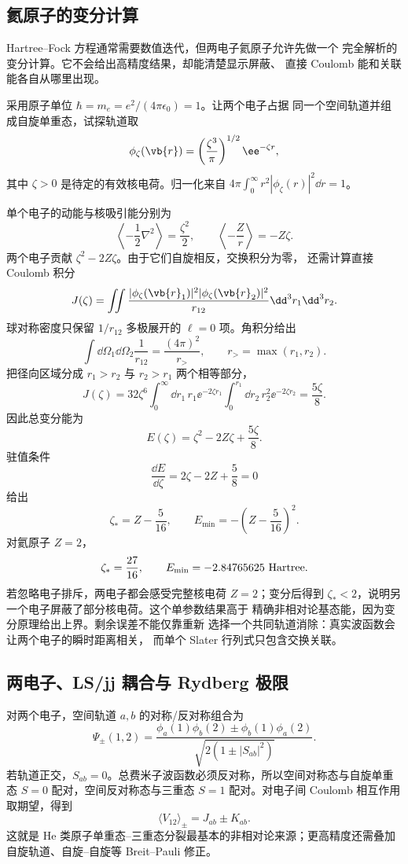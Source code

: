 \subsection{氦原子的变分计算}

Hartree--Fock 方程通常需要数值迭代，但两电子氦原子允许先做一个
完全解析的变分计算。它不会给出高精度结果，却能清楚显示屏蔽、
直接 Coulomb 能和关联能各自从哪里出现。

采用原子单位 $\hbar=m_e=e^2/(4\pi\epsilon_0)=1$。让两个电子占据
同一个空间轨道并组成自旋单重态，试探轨道取
\[
\phi_\zeta(\vb{r})
=\left(\frac{\zeta^3}{\pi}\right)^{1/2}
\ee^{-\zeta r},
\]
其中 $\zeta>0$ 是待定的有效核电荷。归一化来自
$4\pi\int_0^\infty r^2|\phi_\zeta(r)|^2\dd r=1$。

单个电子的动能与核吸引能分别为
\[
\left\langle-\frac12\nabla^2\right\rangle
=\frac{\zeta^2}{2},
\qquad
\left\langle-\frac Zr\right\rangle=-Z\zeta.
\]
两个电子贡献 $\zeta^2-2Z\zeta$。由于它们自旋相反，交换积分为零，
还需计算直接 Coulomb 积分
\[
J(\zeta)=
\iint\frac{
|\phi_\zeta(\vb{r}_1)|^2
|\phi_\zeta(\vb{r}_2)|^2
}{r_{12}}\dd^3r_1\dd^3r_2.
\]
球对称密度只保留 $1/r_{12}$ 多极展开的 $\ell=0$ 项。角积分给出
\[
\int\dd\Omega_1\dd\Omega_2\frac1{r_{12}}
=\frac{(4\pi)^2}{r_>},
\qquad r_>=\max(r_1,r_2).
\]
把径向区域分成 $r_1>r_2$ 与 $r_2>r_1$ 两个相等部分，
\[
J(\zeta)
=32\zeta^6\int_0^\infty\dd r_1\,r_1\ee^{-2\zeta r_1}
\int_0^{r_1}\dd r_2\,r_2^2\ee^{-2\zeta r_2}
=\frac{5\zeta}{8}.
\]
因此总变分能为
\begin{equation}
E(\zeta)=\zeta^2-2Z\zeta+\frac{5\zeta}{8}.
\label{eq:helium-one-parameter-energy}
\end{equation}
驻值条件
\[
\frac{\dd E}{\dd\zeta}
=2\zeta-2Z+\frac58=0
\]
给出
\[
\zeta_*=Z-\frac5{16},\qquad
E_{\min}=-\left(Z-\frac5{16}\right)^2.
\]
对氦原子 $Z=2$，
\[
\zeta_*=\frac{27}{16},\qquad
E_{\min}=-2.84765625\ {\rm Hartree}.
\]
若忽略电子排斥，两电子都会感受完整核电荷 $Z=2$；变分后得到
$\zeta_*<2$，说明另一个电子屏蔽了部分核电荷。这个单参数结果高于
精确非相对论基态能，因为变分原理给出上界。剩余误差不能仅靠重新
选择一个共同轨道消除：真实波函数会让两个电子的瞬时距离相关，
而单个 Slater 行列式只包含交换关联。

\subsection{两电子、LS/jj 耦合与 Rydberg 极限}

对两个电子，空间轨道 $a,b$ 的对称/反对称组合为
\[
\Psi_\pm(1,2)
=\frac{\phi_a(1)\phi_b(2)\pm\phi_b(1)\phi_a(2)}
{\sqrt{2(1\pm|S_{ab}|^2)}}.
\]
若轨道正交，$S_{ab}=0$。总费米子波函数必须反对称，所以空间对称态与自旋单重态 $S=0$ 配对，空间反对称态与三重态 $S=1$ 配对。对电子间 Coulomb 相互作用取期望，得到
\begin{equation}
\langle V_{12}\rangle_\pm=J_{ab}\pm K_{ab}.
\label{eq:helium-coulomb-integral}
\end{equation}
这就是 He 类原子单重态--三重态分裂最基本的非相对论来源；更高精度还需叠加自旋轨道、自旋--自旋等 Breit--Pauli 修正。

